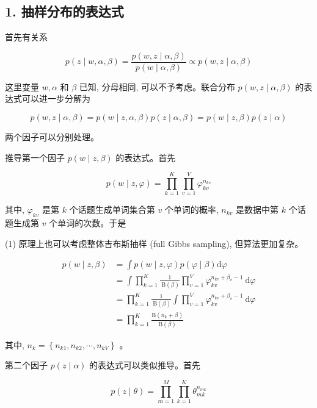 \documentclass[10pt]{article}
\begin{document}
\begin{CJK*}{UTF8}{bsmi}
\section*{1. 抽样分布的表达式}
首先有关系


\begin{equation*}
p(z \mid w, \alpha, \beta)=\frac{p(w, z \mid \alpha, \beta)}{p(w \mid \alpha, \beta)} \propto p(w, z \mid \alpha, \beta) \tag{20.20}
\end{equation*}


这里变量 $w, \alpha$ 和 $\beta$ 已知, 分母相同, 可以不予考虑。联合分布 $p(w, z \mid \alpha, \beta)$ 的表达式可以进一步分解为


\begin{equation*}
p(w, z \mid \alpha, \beta)=p(w \mid z, \alpha, \beta) p(z \mid \alpha, \beta)=p(w \mid z, \beta) p(z \mid \alpha) \tag{20.21}
\end{equation*}


两个因子可以分别处理。

推导第一个因子 $p(w \mid z, \beta)$ 的表达式。首先


\begin{equation*}
p(w \mid z, \varphi)=\prod_{k=1}^{K} \prod_{v=1}^{V} \varphi_{k v}^{n_{k v}} \tag{20.22}
\end{equation*}


其中, $\varphi_{k v}$ 是第 $k$ 个话题生成单词集合第 $v$ 个单词的概率, $n_{k v}$ 是数据中第 $k$ 个话题生成第 $v$ 个单词的次数。于是

(1) 原理上也可以考虑整体吉布斯抽样 (full Gibbs sampling), 但算法更加复杂。


\begin{align*}
p(w \mid z, \beta) & =\int p(w \mid z, \varphi) p(\varphi \mid \beta) \mathrm{d} \varphi \\
& =\int \prod_{k=1}^{K} \frac{1}{\mathrm{~B}(\beta)} \prod_{v=1}^{V} \varphi_{k v}^{n_{k v}+\beta_{v}-1} \mathrm{~d} \varphi \\
& =\prod_{k=1}^{K} \frac{1}{\mathrm{~B}(\beta)} \int \prod_{v=1}^{V} \varphi_{k v}^{n_{k v}+\beta_{v}-1} \mathrm{~d} \varphi \\
& =\prod_{k=1}^{K} \frac{\mathrm{B}\left(n_{k}+\beta\right)}{\mathrm{B}(\beta)} \tag{20.23}
\end{align*}


其中, $n_{k}=\left\{n_{k 1}, n_{k 2}, \cdots, n_{k V}\right\}$ 。

第二个因子 $p(z \mid \alpha)$ 的表达式可以类似推导。首先


\begin{equation*}
p(z \mid \theta)=\prod_{m=1}^{M} \prod_{k=1}^{K} \theta_{m k}^{n_{m k}} \tag{20.24}
\end{equation*}



\end{CJK*}
\end{document}
